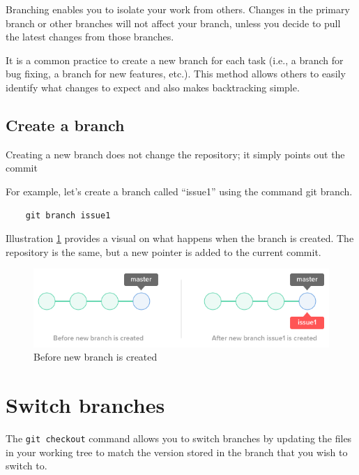 \documentclass[10pt,a4paper,english]{report}
\begin{document}
    Branching enables you to isolate your work from others. Changes in the primary branch or other branches will not affect your branch, unless you decide to pull the latest changes from those branches.

    It is a common practice to create a new branch for each task (i.e., a branch for bug fixing, a branch for new features, etc.). This method allows others to easily identify what changes to expect and also makes backtracking simple.

    \section{Create a branch}

    Creating a new branch does not change the repository; it simply points out the commit

    For example, let's create a branch called “issue1” using the command git branch.
    \begin{verbatim}
    git branch issue1
    \end{verbatim}

    Illustration \ref{fig:new-branch} provides a visual on what happens when the branch is created. The repository is the same, but a new pointer is added to the current commit.

    \begin{figure}[ht]
    \begin{center}
    \includegraphics[scale=0.5]{images/using_branches_003.png}
    \end{center}
    \caption{Before new branch is created}
    \label{fig:new-branch}
    \end{figure}

\chapter{Switch branches}

    The \verb|git checkout| command allows you to switch branches by updating the files in your working tree to match the version stored in the branch that you wish to switch to.
\end{document}

